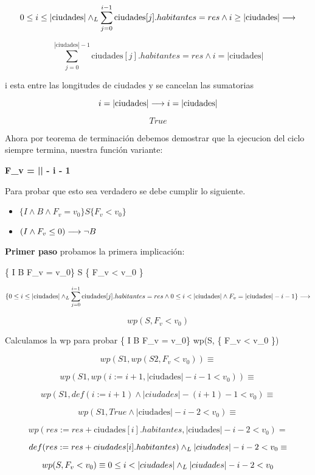\documentclass[10pt,a4paper]{article}
\begin{document}
\[
0 \leq i \leq |\text{ciudades}| \land _L \sum_{j=0}^{i-1} \text{ciudades}[j].habitantes = res \land i \geq |\text{ciudades}| \longrightarrow
\]

\[
 \sum_{j=0}^{|\text{ciudades}|-1} \text{ciudades}[j].habitantes = res \land i = |\text{ciudades}|
\]

i esta entre las longitudes de ciudades y se cancelan las sumatorias

\[
i = |\text{ciudades}| \longrightarrow i = |\text{ciudades}|
\]

\[
True
\]

Ahora por teorema de terminación debemos demostrar que la ejecucion del ciclo siempre termina, nuestra función variante:

\textbf{F_v = || - i - 1}

Para probar que esto sea verdadero se debe cumplir lo siguiente.

\begin{itemize}
    \item \( \{ I \land B \land F_v = v_0\} S \{ F_v < v_0 \} \)
    \item \( (I \land F_v \leq 0) \longrightarrow \neg B \)
\end{itemize}

\textbf{Primer paso} probamos la primera implicación:

\{ I \land B \land F_v = v_0\} S \{ F_v < v_0 \}

\[
\{0 \leq i \leq |\text{ciudades}| \land _L \sum_{j=0}^{i-1} \text{ciudades}[j].habitantes = res \land 0 \leq i < |\text{ciudades}| \land F_v = |\text{ciudades}| - i - 1\} \longrightarrow 
\]

\[
wp(S, F_v < v_0) 
\]


Calculamos la wp para probar \{ I \land B \land F_v = v_0\} \implica wp(S, \{ F_v < v_0 \}) 

\[
wp(S1, wp(S2, F_v < v_0)) \equiv 
\]

\[
wp(S1, wp(i:=i+1, |\text{ciudades}|- i - 1 < v_0)) \equiv
\]

\[
wp(S1, def(i := i + 1) \land |ciudades| - (i + 1) - 1 < v_0) \equiv
\]

\[
wp(S1, True \land |\text{ciudades}| - i - 2 < v_0) \equiv
\]

\[
wp(res:= res + \text{ciudades}[i].habitantes, |\text{ciudades}| - i - 2 < v_0) = 
\]

\[
def(res := res + ciudades[i].habitantes) \land _L |ciudades| - i - 2 < v_0 \equiv
\]

\[
wp(S, F_v < v_0) \equiv 0 \leq i < |ciudades| \land _L |ciudades| - i - 2 < v_0
\]
\end{document}
